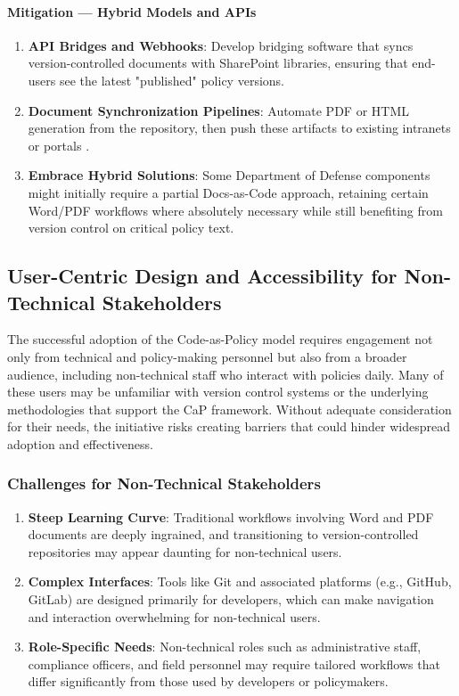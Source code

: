 \documentclass[11pt]{article}
\begin{document}
	\paragraph{Mitigation --- Hybrid Models and APIs}
	\begin{enumerate}
		\item \textbf{API Bridges and Webhooks}: Develop bridging software that syncs version-controlled documents with SharePoint libraries, ensuring that end-users see the latest "published" policy versions.
		\item \textbf{Document Synchronization Pipelines}: Automate PDF or HTML generation from the repository, then push these artifacts to existing intranets or portals \cite{Atlassian2022}.
		\item \textbf{Embrace Hybrid Solutions}: Some Department of Defense components might initially require a partial Docs-as-Code approach, retaining certain Word/PDF workflows where absolutely necessary while still benefiting from version control on critical policy text.
	\end{enumerate}

	\subsection{User-Centric Design and Accessibility for Non-Technical Stakeholders}

	The successful adoption of the Code-as-Policy model requires engagement not only from technical and policy-making personnel but also from a broader audience, including non-technical staff who interact with policies daily. Many of these users may be unfamiliar with version control systems or the underlying methodologies that support the CaP framework. Without adequate consideration for their needs, the initiative risks creating barriers that could hinder widespread adoption and effectiveness.

	\subsubsection{Challenges for Non-Technical Stakeholders}
	\begin{enumerate}
		\item \textbf{Steep Learning Curve}: Traditional workflows involving Word and PDF documents are deeply ingrained, and transitioning to version-controlled repositories may appear daunting for non-technical users.
		\item \textbf{Complex Interfaces}: Tools like Git and associated platforms (e.g., GitHub, GitLab) are designed primarily for developers, which can make navigation and interaction overwhelming for non-technical users.
		\item \textbf{Role-Specific Needs}: Non-technical roles such as administrative staff, compliance officers, and field personnel may require tailored workflows that differ significantly from those used by developers or policymakers.
	\end{enumerate}
\end{document}
